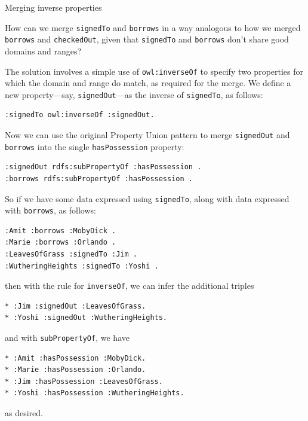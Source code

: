 \begin{challenge}{Merging inverse properties}

How can we merge \texttt{signedTo} and \texttt{borrows} in a way analogous to how we
merged \texttt{borrows} and
\texttt{checkedOut}, given that \texttt{signedTo} and \texttt{borrows} don't share good domains and
ranges?

\solution

The solution involves a simple use of \texttt{owl:inverseOf} to specify two
properties for which the domain and range do match, as required for the
merge. We define a new property---say, \texttt{signedOut}---as the inverse of
\texttt{signedTo}, as follows:

\begin{lstlisting}
:signedTo owl:inverseOf :signedOut.
\end{lstlisting}

Now we can use the original Property Union pattern to merge \texttt{signedOut}
and \texttt{borrows} into the single
\texttt{hasPossession} property:

\begin{lstlisting}
:signedOut rdfs:subPropertyOf :hasPossession .
:borrows rdfs:subPropertyOf :hasPossession .
\end{lstlisting}

So if we have some data expressed using \texttt{signedTo}, along with data
expressed with \texttt{borrows}, as follows:

\begin{lstlisting}
:Amit :borrows :MobyDick .
:Marie :borrows :Orlando .
:LeavesOfGrass :signedTo :Jim .
:WutheringHeights :signedTo :Yoshi .
\end{lstlisting}

then with the rule for \texttt{inverseOf}, we can infer the additional triples

\begin{lstlisting}
* :Jim :signedOut :LeavesOfGrass.
* :Yoshi :signedOut :WutheringHeights.
\end{lstlisting}

and with \texttt{subPropertyOf}, we have

\begin{lstlisting}
* :Amit :hasPossession :MobyDick.
* :Marie :hasPossession :Orlando.
* :Jim :hasPossession :LeavesOfGrass.
* :Yoshi :hasPossession :WutheringHeights.
\end{lstlisting}

as desired.


\end{challenge}
